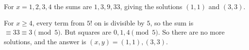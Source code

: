 For $x=1,2,3,4$ the sums are $1,3,9,33$, giving the solutions $(1,1)$ and $(3,3)$.

For $x\ge4$, every term from $5!$ on is divisible by $5$, so the sum is $\equiv33\equiv3\pmod5$. But squares are $0,1,4\pmod5$. So there are no more solutions, and the answer is $\boxed{(x,y)=(1,1),(3,3)}$.
